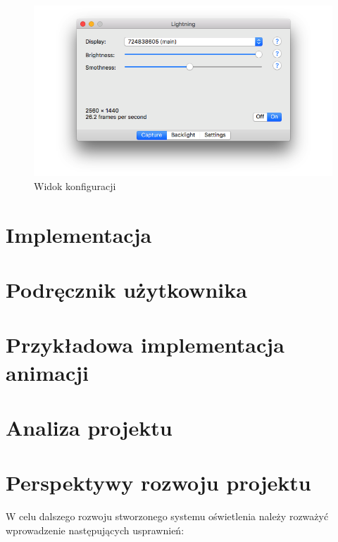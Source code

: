 \documentclass[12pt]{report}
\begin{document}
\begin{figure}[h]
\centering
\includegraphics[width=\textwidth]{../resources/capture.png}
\caption{Widok konfiguracji}
\end{figure}

\section{Implementacja}


\section{Podręcznik użytkownika}


\section{Przykładowa implementacja animacji}


\section{Analiza projektu}


\section{Perspektywy rozwoju projektu} \label{prp}

W celu dalszego rozwoju stworzonego systemu oświetlenia należy rozważyć wprowadzenie następujących usprawnień:
\end{document}
